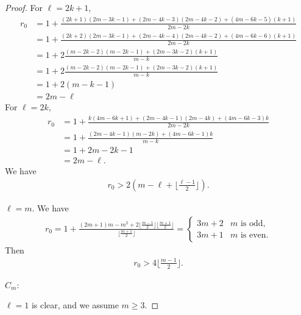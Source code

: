 \documentclass[11pt,a4paper,usenames,dvipsnames,reqno]{amsart}
\numberwithin{equation}{section}
\theoremstyle{definition}
\theoremstyle{remark}
\begin{document}
{\begin{proof}
For $\ell=2k+1$,
\begin{align*}
      r_0&=1+\frac{(2k+1)(2m-3k-1)+(2m-4k-3)(2m-4k-2)+\left(4m-6k-5\right)(k+1)}{2m-2k}\\
      &=1+\frac{(2k+2)(2m-3k-1)+(2m-4k-4)(2m-4k-2)+\left(4m-6k-6\right)(k+1)}{2m-2k}\\
      &=1+2\frac{(m-2k-2)(m-2k-1)+\left(2m-3k-2\right)(k+1)}{m-k}\\
      &=1+2\frac{(m-2k-2)(m-2k-1)+\left(2m-3k-2\right)(k+1)}{m-k}\\
      &=1+2(m-k-1)\\
      &=2m-\ell
\end{align*}
For $\ell=2k$, 
\begin{align*}
    r_0&=1+\frac{k(4m-6k+1)+(2m-4k-1)(2m-4k)+\left(4m-6k-3\right)k}{2m-2k}\\
    &=1+\frac{(2m-4k-1)(m-2k)+\left(4m-6k-1\right)k}{m-k}\\
    &=1+2m-2k-1\\
    &=2m-\ell.
\end{align*}
We have
\begin{align*}
    r_0>2(m-\ell+\lfloor\frac{\ell-1}{2}\rfloor).
\end{align*}


$\ell=m$. We have
\begin{align*}
    r_0=1+\frac{(2m+1)m-m^2+2\lfloor \frac{m-1}{2}\rfloor \lfloor \frac{m+1}{2}\rfloor}{\lfloor\frac{m+1}{2}\rfloor}=\begin{cases}
    3m+2 & m \textrm{ is odd,}\\
    3m+1 & m \textrm{ is even.}
    \end{cases}
\end{align*}
Then
\begin{align*}
    r_0>4\lfloor \frac{m-1}{2}\rfloor.
\end{align*}


$C_m$:

$\ell=1$ is clear, and we assume $m\ge 3$.


\end{proof}}
\end{document}
